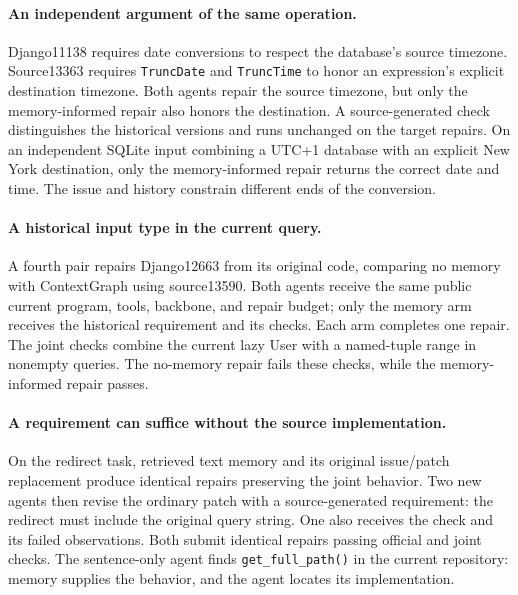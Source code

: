 \paragraph{An independent argument of the same operation.}
Django11138 requires date conversions to respect the database's source timezone.
Source13363 requires \texttt{TruncDate} and \texttt{TruncTime} to honor an expression's explicit destination timezone.
Both agents repair the source timezone, but only the memory-informed repair also honors the destination.
A source-generated check distinguishes the historical versions and runs unchanged on the target repairs.
On an independent SQLite input combining a UTC+1 database with an explicit New York destination, only the memory-informed repair returns the correct date and time.
The issue and history constrain different ends of the conversion.

\paragraph{A historical input type in the current query.}
A fourth pair repairs Django12663 from its original code, comparing no memory
with ContextGraph using source13590. Both agents receive the same public
current program, tools, backbone, and repair budget; only the memory arm
receives the historical requirement and its checks. Each arm completes one
repair. The joint checks combine the current lazy User with a named-tuple
range in nonempty queries. The no-memory repair fails these checks, while
the memory-informed repair passes.

\paragraph{A requirement can suffice without the source implementation.}
On the redirect task, retrieved text memory and its original issue/patch replacement
produce identical repairs preserving the joint behavior. Two new agents then
revise the ordinary patch with a source-generated requirement: the redirect
must include the original query string. One also receives the check and its
failed observations. Both submit identical repairs passing official and joint
checks. The sentence-only agent finds \texttt{get\_full\_path()} in the current
repository: memory supplies the behavior, and the agent locates its implementation.

